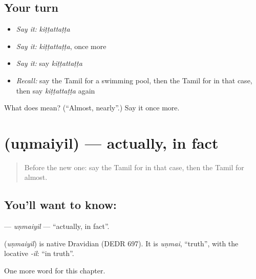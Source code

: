 \subsection*{Your turn}
\begin{itemize}
\raggedright
  \item \emph{Say it:} \emph{kiṭṭattaṭṭa}
  \item \emph{Say it:} \emph{kiṭṭattaṭṭa}, once more
  \item \emph{Say it:} say \emph{kiṭṭattaṭṭa}
  \item \emph{Recall:} say the Tamil for a swimming pool, then the Tamil for in that case, then say \emph{kiṭṭattaṭṭa} again
\end{itemize}

\begin{tcolorbox}[breakable,colback=teal!4,colframe=teal!35!black,title={Before you move on}]
What does  mean? (\textquotedblleft{}Almost, nearly\textquotedblright{}.) Say it once more.
\end{tcolorbox}
\section[\texorpdfstring{\ta{உண்மையில்} (uṇmaiyil)}{உண்மையில் (uṇmaiyil)}]{ (uṇmaiyil) — actually, in fact}

\label{lesson:TA-C207-unmaiyil}



\begin{quote}
Before the new one: say the Tamil for in that case, then the Tamil for almost.
\end{quote}

\subsection*{You'll want to know: }
\textbf{} — \emph{uṇmaiyil} — \textquotedblleft{}actually, in fact\textquotedblright{}.

\begin{cousinweb}
\textbf{} (\emph{uṇmaiyil}) is native Dravidian (DEDR 697). It is \emph{uṇmai}, \textquotedblleft{}truth\textquotedblright{}, with the locative \emph{-il}: \textquotedblleft{}in truth\textquotedblright{}.
\end{cousinweb}

\begin{grammarlens}[title={What you've built}]
One more word for this chapter.
\end{grammarlens}


